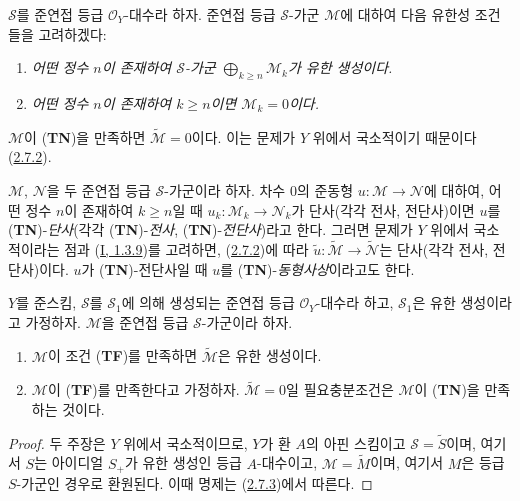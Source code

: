 \begin{env}[3.4.2]
\label{II.3.4.2-ko}
$\mathcal{S}$를 준연접 등급 $\mathcal{O}_Y$-대수라 하자. 준연접 등급
$\mathcal{S}$-가군 $\mathcal{M}$에 대하여 다음 유한성 조건들을
고려하겠다:
\begin{enumerate}
  \item[(\textbf{TF})] \emph{어떤 정수 $n$이 존재하여
    $\mathcal{S}$-가군 $\bigoplus_{k\geq n}\mathcal{M}_k$가 유한 생성이다.}
  \item[(\textbf{TN})] \emph{어떤 정수 $n$이 존재하여
    $k\geq n$이면 $\mathcal{M}_k=0$이다.}
\end{enumerate}
$\mathcal{M}$이 (\textbf{TN})을 만족하면
$\widetilde{\mathcal{M}}=0$이다. 이는 문제가 $Y$ 위에서 국소적이기
때문이다(\hyperref[II.2.7.2-ko]{2.7.2}).

$\mathcal{M}$, $\mathcal{N}$을 두 준연접 등급 $\mathcal{S}$-가군이라
하자. 차수 $0$의 준동형 $u:\mathcal{M}\to\mathcal{N}$에 대하여, 어떤
정수 $n$이 존재하여 $k\geq n$일 때
$u_k:\mathcal{M}_k\to\mathcal{N}_k$가 단사(각각 전사, 전단사)이면
$u$를 (\textbf{TN})-\emph{단사}(각각 (\textbf{TN})-\emph{전사},
(\textbf{TN})-\emph{전단사})라고 한다. 그러면 문제가 $Y$ 위에서
국소적이라는 점과 (\hyperref[I.1.3.9-ko]{I, 1.3.9})를 고려하면,
(\hyperref[II.2.7.2-ko]{2.7.2})에 따라
$\widetilde{u}:\widetilde{\mathcal{M}}\to\widetilde{\mathcal{N}}$는
단사(각각 전사, 전단사)이다. $u$가 (\textbf{TN})-전단사일 때 $u$를
(\textbf{TN})-\emph{동형사상}이라고도 한다.
\end{env}

\begin{proposition}[3.4.3]
\label{II.3.4.3-ko}
$Y$를 준스킴, $\mathcal{S}$를 $\mathcal{S}_1$에 의해 생성되는 준연접
등급 $\mathcal{O}_Y$-대수라 하고, $\mathcal{S}_1$은 유한 생성이라고
가정하자. $\mathcal{M}$을 준연접 등급 $\mathcal{S}$-가군이라 하자.
\begin{enumerate}
  \item[\rm(i)] $\mathcal{M}$이 조건 (\textbf{TF})를 만족하면
    $\widetilde{\mathcal{M}}$은 유한 생성이다.
  \item[\rm(ii)] $\mathcal{M}$이 (\textbf{TF})를 만족한다고 가정하자.
    $\widetilde{\mathcal{M}}=0$일 필요충분조건은 $\mathcal{M}$이
    (\textbf{TN})을 만족하는 것이다.
\end{enumerate}
\end{proposition}

\begin{proof}
두 주장은 $Y$ 위에서 국소적이므로, $Y$가 환 $A$의 아핀 스킴이고
$\mathcal{S}=\widetilde{S}$이며, 여기서 $S$는 아이디얼 $S_+$가 유한
생성인 등급 $A$-대수이고, $\mathcal{M}=\widetilde{M}$이며, 여기서
$M$은 등급 $S$-가군인 경우로 환원된다. 이때 명제는
(\hyperref[II.2.7.3-ko]{2.7.3})에서 따른다.
\end{proof}

